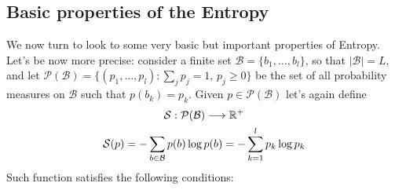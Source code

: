 \subsection{Basic properties of the Entropy}
We now turn to look to some very basic but important properties of Entropy.
\\Let's be now more precise: consider a finite set $\mathcal{B} = \{ b_1, \dots, b_l \}$, so that $|\mathcal{B}| = L$, and let $\mathcal{P(\mathcal{B})} = \{ (p_1, \dots, p_l) : \sum_j p_j = 1, \, p_j \geq 0 \}$ be the set of all probability measures on $\mathcal{B}$ such that $p(b_k) = p_k$. Given $p \in \mathcal{P(\mathcal{B})} $ let's again define 
\begin{gather}
    \mathcal{S}: \mathcal{P(\mathcal{B})} \longrightarrow \mathbb{R}^+ \nonumber \\
    \mathcal{S}(p) = - \sum_{b \in \mathcal{B}} p(b) \log p(b) = - \sum_{k=1}^l p_k \log p_k
\end{gather}
Such function satisfies the following conditions:
